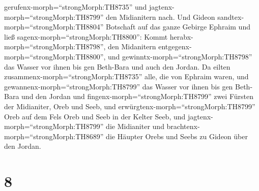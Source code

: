 gerufenx-morph=``strongMorph:TH8735'' und
jagtenx-morph=``strongMorph:TH8799'' den Midianitern nach. 
Und Gideon sandtex-morph=``strongMorph:TH8804'' Botschaft auf das ganze
Gebirge Ephraim und ließ sagenx-morph=``strongMorph:TH8800'': Kommt
herabx-morph=``strongMorph:TH8798'', den Midanitern
entgegenx-morph=``strongMorph:TH8800'', und
gewinntx-morph=``strongMorph:TH8798'' das Wasser vor ihnen bis gen
Beth-Bara und auch den Jordan. Da eilten
zusammenx-morph=``strongMorph:TH8735'' alle, die von Ephraim waren, und
gewannenx-morph=``strongMorph:TH8799'' das Wasser vor ihnen bis gen
Beth-Bara und den Jordan  und
fingenx-morph=``strongMorph:TH8799'' zwei Fürsten der Midianiter, Oreb
und Seeb, und erwürgtenx-morph=``strongMorph:TH8799'' Oreb auf dem Fels
Oreb und Seeb in der Kelter Seeb, und
jagtenx-morph=``strongMorph:TH8799'' die Midianiter und
brachtenx-morph=``strongMorph:TH8689'' die Häupter Orebs und Seebs zu
Gideon über den Jordan.

\hypertarget{section-7}{%
\section{8}\label{section-7}}

